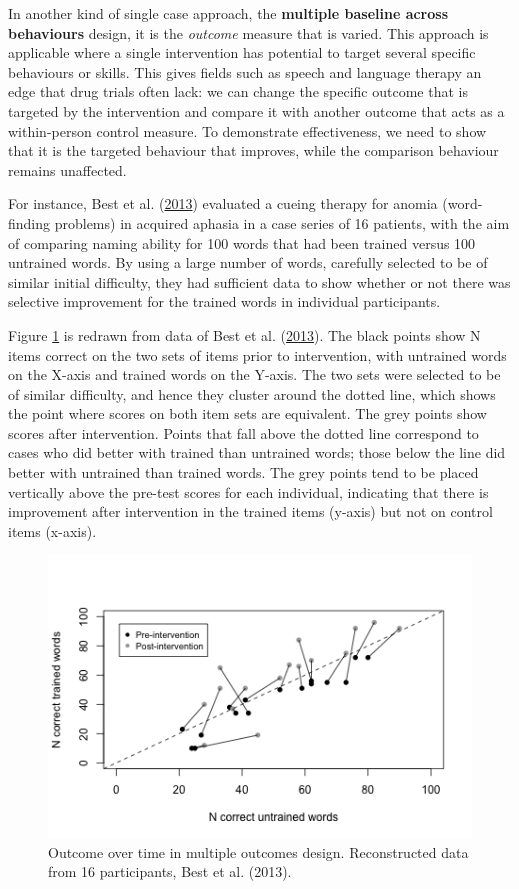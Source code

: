 \documentclass{krantz}
\begin{document}
In another kind of single case approach, the \textbf{multiple baseline across behaviours} design, it is the \emph{outcome} measure that is varied. This approach is applicable where a single intervention has potential to target several specific behaviours or skills. This gives fields such as speech and language therapy an edge that drug trials often lack: we can change the specific outcome that is targeted by the intervention and compare it with another outcome that acts as a within-person control measure. To demonstrate effectiveness, we need to show that it is the targeted behaviour that improves, while the comparison behaviour remains unaffected.

For instance, Best et al. (\protect\hyperlink{ref-best2013}{2013}) evaluated a cueing therapy for anomia (word-finding problems) in acquired aphasia in a case series of 16 patients, with the aim of comparing naming ability for 100 words that had been trained versus 100 untrained words. By using a large number of words, carefully selected to be of similar initial difficulty, they had sufficient data to show whether or not there was selective improvement for the trained words in individual participants.

Figure \ref{fig:bestplot} is redrawn from data of Best et al. (\protect\hyperlink{ref-best2013}{2013}). The black points show N items correct on the two sets of items prior to intervention, with untrained words on the X-axis and trained words on the Y-axis. The two sets were selected to be of similar difficulty, and hence they cluster around the dotted line, which shows the point where scores on both item sets are equivalent. The grey points show scores after intervention. Points that fall above the dotted line correspond to cases who did better with trained than untrained words; those below the line did better with untrained than trained words. The grey points tend to be placed vertically above the pre-test scores for each individual, indicating that there is improvement after intervention in the trained items (y-axis) but not on control items (x-axis).

\begin{figure}
\includegraphics[width=0.75\linewidth]{images_bw/bestplot} \caption{Outcome over time in multiple outcomes design. Reconstructed data from 16 participants, Best et al. (2013).}\label{fig:bestplot}
\end{figure}
\end{document}
